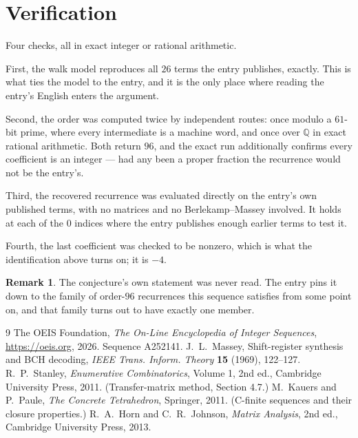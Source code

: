 \documentclass[11pt,a4paper]{article}
\theoremstyle{plain}
\theoremstyle{definition}
\newtheorem{remark}[theorem]{Remark}
\begin{document}
\section{Verification}

Four checks, all in exact integer or rational arithmetic.

First, the walk model reproduces all $26$ terms the entry publishes, exactly. This is
what ties the model to the entry, and it is the only place where reading the entry's English
enters the argument.

Second, the order was computed twice by independent routes: once modulo a $61$-bit prime, where
every intermediate is a machine word, and once over $\mathbb{Q}$ in exact rational arithmetic.
Both return $96$, and the exact run additionally confirms every coefficient is an integer
--- had any been a proper fraction the recurrence would not be the entry's.

Third, the recovered recurrence was evaluated directly on the entry's own published terms, with
no matrices and no Berlekamp--Massey involved. It holds at each of the $0$ indices where
the entry publishes enough earlier terms to test it.

Fourth, the last coefficient was checked to be nonzero, which is what the identification above
turns on; it is $-4$.

\begin{remark}
The conjecture's own statement was never read. The entry pins it down to the family of
order-$96$ recurrences this sequence satisfies from some point on, and that family turns
out to have exactly one member.
\end{remark}

\begin{thebibliography}{9}
 The OEIS Foundation, \emph{The On-Line Encyclopedia of Integer
Sequences}, \url{https://oeis.org}, 2026. Sequence A252141.
 J.~L.~Massey, Shift-register synthesis and BCH decoding, \emph{IEEE
Trans. Inform. Theory} \textbf{15} (1969), 122--127.
 R.~P.~Stanley, \emph{Enumerative Combinatorics}, Volume 1, 2nd ed.,
Cambridge University Press, 2011. (Transfer-matrix method, Section 4.7.)
 M.~Kauers and P.~Paule, \emph{The Concrete Tetrahedron}, Springer, 2011.
(C-finite sequences and their closure properties.)
 R.~A.~Horn and C.~R.~Johnson, \emph{Matrix Analysis}, 2nd ed., Cambridge
University Press, 2013.
\end{thebibliography}
\end{document}
